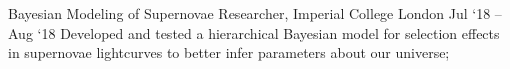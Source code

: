 \experience
    {Bayesian Modeling of Supernovae}
    {Researcher, Imperial College London}
    {Jul `18 -- Aug `18}
    {
        Developed and tested a hierarchical Bayesian model for selection effects in
        supernovae lightcurves to better infer parameters about our universe;
    }
